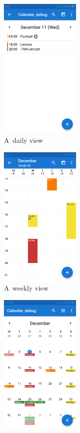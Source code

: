 \documentclass[a4paper, 11pt]{article}
\begin{document}
	\begin{figure}[H]
		\centering

		\begin{subfigure}{.24 \textwidth}
			\centering
			\includegraphics[width=10.5em, frame]{img/calendar_day.png}
			\caption{A~daily view}
		\end{subfigure}
%
		\begin{subfigure}{.24 \textwidth}
			\centering
			\includegraphics[width=10.5em, frame]{img/calendar_week.png}
			\caption{A~weekly view}
		\end{subfigure}
%
		\begin{subfigure}{.24 \textwidth}
			\centering
			\includegraphics[width=10.5em, frame]{img/calendar_month.png}

\end{subfigure}
\end{figure}
\end{document}

